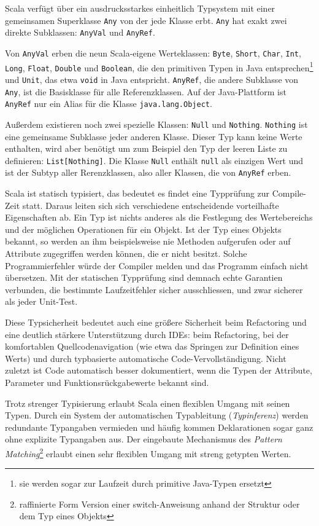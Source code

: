\documentclass[a4paper, 12pt, hidelinks, listof=totoc, listoftables=totoc, bibliography=totoc]{scrreprt}
\begin{document}
Scala verfügt über ein ausdrucksstarkes einheitlich Typsystem mit einer gemeinsamen Superklasse \texttt{Any} von der jede Klasse erbt. \texttt{Any} hat exakt zwei direkte Subklassen: \texttt{AnyVal} und \texttt{AnyRef}. 

Von \texttt{AnyVal} erben die neun Scala-eigene Werteklassen: \texttt{Byte}, \texttt{Short}, \texttt{Char}, \texttt{Int}, \texttt{Long}, \texttt{Float}, \texttt{Double} und \texttt{Boolean}, die den primitiven Typen in Java entsprechen\footnote{
	sie werden sogar zur Laufzeit durch primitive Java-Typen ersetzt}
und \texttt{Unit}, das etwa \texttt{void} in Java entspricht. \texttt{AnyRef}, die andere Subklasse von \texttt{Any}, ist die Basisklasse für alle Referenzklassen. Auf der Java-Plattform ist \texttt{AnyRef} nur ein Alias für die Klasse \texttt{java.lang.Object}. 

Außerdem existieren noch zwei spezielle Klassen: \texttt{Null} und \texttt{Nothing}. \texttt{Nothing} ist eine gemeinsame Subklasse jeder anderen Klasse. Dieser Typ kann keine Werte enthalten, wird aber benötigt um zum Beispiel den Typ der leeren Liste zu definieren: \texttt{List[Nothing]}. Die Klasse \texttt{Null} enthält \texttt{null} als einzigen Wert und ist der Subtyp aller Rerenzklassen, also aller Klassen, die von \texttt{AnyRef} erben.

Scala ist statisch typisiert, das bedeutet es findet eine Typprüfung zur Compile-Zeit statt. Daraus leiten sich sich verschiedene entscheidende vorteilhafte Eigenschaften ab. Ein Typ ist nichts anderes als die Festlegung des Wertebereichs und der möglichen Operationen für ein Objekt. Ist der Typ eines Objekts bekannt, so werden an ihm beispielsweise nie Methoden aufgerufen oder auf Attribute zugegriffen werden können, die er nicht besitzt. Solche Programmierfehler würde der Compiler melden und das Programm einfach nicht übersetzen. Mit der statischen Typprüfung sind demnach echte Garantien verbunden, die bestimmte Laufzeitfehler sicher ausschliessen, und zwar sicherer als jeder Unit-Test.

Diese Typsicherheit bedeutet auch eine größere Sicherheit beim Refactoring und eine deutlich stärkere Unterstützung durch IDEs: beim Refactoring, bei der komfortablen Quellcodenavigation (wie etwa das Springen zur Definition eines Werts) und durch typbasierte automatische Code-Vervollständigung. Nicht zuletzt ist Code automatisch besser dokumentiert, wenn die Typen der Attribute, Parameter und Funktionsrückgabewerte bekannt sind.

Trotz strenger Typisierung erlaubt Scala einen flexiblen Umgang mit seinen Typen. Durch ein System der automatischen Typableitung (\textit{Typinferenz}) werden redundante Typangaben vermieden und häufig kommen Deklarationen sogar ganz ohne explizite Typangaben aus. Der eingebaute Mechanismus des \textit{Pattern Matching}\footnote{
	raffinierte Form Version einer switch-Anweisung anhand der Struktur oder dem Typ eines Objekts}
erlaubt einen sehr flexiblen Umgang mit streng getypten Werten.
\end{document}
